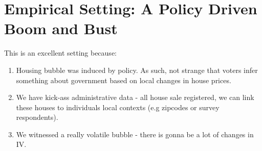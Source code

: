 \documentclass[12pt,a4paper]{article}
\begin{document}






\section{Empirical Setting: A Policy Driven Boom and Bust}

This is an excellent setting because: 

\begin{enumerate}
	\item Housing bubble was induced by policy. As such, not strange that voters infer something about government based on local changes in house prices.
	\item We have kick-ass administrative data - all house sale registered, we can link these houses to individuals local contexts (e.g zipcodes or survey respondents).
	\item We witnessed a really volatile bubble - there is gonna be a lot of changes in IV.
\end{enumerate}
\end{document}
